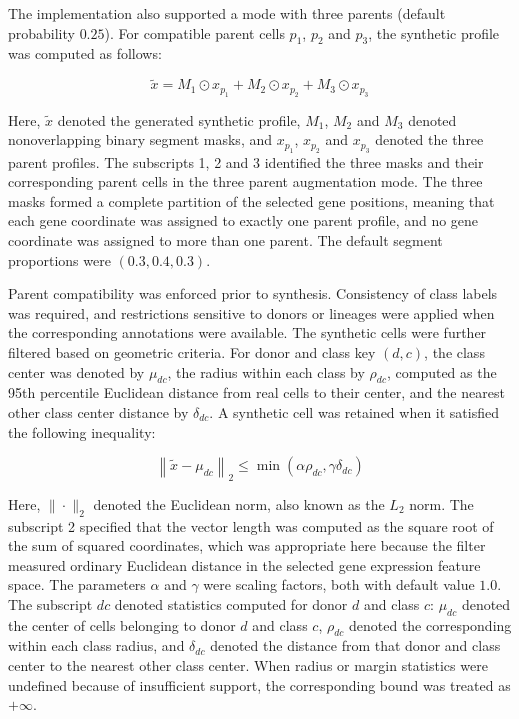 \documentclass[11pt]{article}
\begin{document}
The implementation also supported a mode with three parents (default probability $0.25$). For compatible parent cells $p_1$, $p_2$ and $p_3$, the synthetic profile was computed as follows:

\begin{equation}
\tilde{x}=
M_1\odot x_{p_1}+
M_2\odot x_{p_2}+
M_3\odot x_{p_3}
  \label{eq:mix3}
\end{equation}

Here, \(\tilde{x}\) denoted the generated synthetic profile, \(M_1\), \(M_2\) and \(M_3\) denoted nonoverlapping binary segment masks, and \(x_{p_1}\), \(x_{p_2}\) and \(x_{p_3}\) denoted the three parent profiles. The subscripts 1, 2 and 3 identified the three masks and their corresponding parent cells in the three parent augmentation mode. The three masks formed a complete partition of the selected gene positions, meaning that each gene coordinate was assigned to exactly one parent profile, and no gene coordinate was assigned to more than one parent. The default segment proportions were \((0.3,0.4,0.3)\).

Parent compatibility was enforced prior to synthesis. Consistency of class labels was required, and restrictions sensitive to donors or lineages were applied when the corresponding annotations were available. The synthetic cells were further filtered based on geometric criteria. For donor and class key $(d,c)$, the class center was denoted by $\mu_{dc}$, the radius within each class by $\rho_{dc}$, computed as the 95th percentile Euclidean distance from real cells to their center, and the nearest other class center distance by $\delta_{dc}$. A synthetic cell was retained when it satisfied the following inequality:

\begin{equation}
\left\|
\tilde{x}-\mu_{dc}
\right\|_{2}
\le
\min
\left(
\alpha\rho_{dc},
\gamma\delta_{dc}
\right)
  \label{eq:mix_filter}
\end{equation}

Here, $\|\cdot\|_{2}$ denoted the Euclidean norm, also known as the $L_{2}$ norm. The subscript 2 specified that the vector length was computed as the square root of the sum of squared coordinates, which was appropriate here because the filter measured ordinary Euclidean distance in the selected gene expression feature space. The parameters $\alpha$ and $\gamma$ were scaling factors, both with default value $1.0$. The subscript $dc$ denoted statistics computed for donor $d$ and class $c$: $\mu_{dc}$ denoted the center of cells belonging to donor $d$ and class $c$, $\rho_{dc}$ denoted the corresponding within each class radius, and $\delta_{dc}$ denoted the distance from that donor and class center to the nearest other class center. When radius or margin statistics were undefined because of insufficient support, the corresponding bound was treated as $+\infty$.
\end{document}
